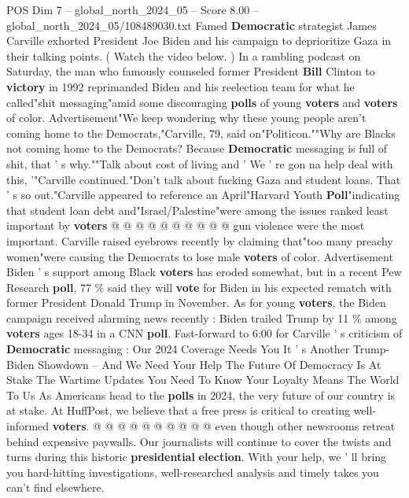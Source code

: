 \begin{textsample}{POS Dim 7 – global\_north\_2024\_05 – Score 8.00 – global\_north\_2024\_05/108489030.txt}  \label{ex:f7_pos_060}
Famed \textbf{Democratic} strategist James Carville exhorted President Joe Biden and his campaign to deprioritize Gaza in their talking points. ( Watch the video below. ) In a rambling podcast on Saturday, the man who famously counseled former President \textbf{Bill} Clinton to \textbf{victory} in 1992 reprimanded Biden and his reelection team for what he called"shit messaging"amid some discouraging \textbf{polls} of young \textbf{voters} and \textbf{voters} of color.
Advertisement"We keep wondering why these young people aren't coming home to the Democrats,"Carville, 79, said on"Politicon.""Why are Blacks not coming home to the Democrats?
Because \textbf{Democratic} messaging is full of shit, that ' s why.""Talk about cost of living and ' We ' re gon na help deal with this, '"Carville continued."Don't talk about fucking Gaza and student loans.
That ' s so out."Carville appeared to reference an April"Harvard Youth \textbf{Poll}"indicating that student loan debt and"Israel/Palestine"were among the issues ranked least important by \textbf{voters} @ @ @ @ @ @ @ @ @ @ gun violence were the most important.
Carville raised eyebrows recently by claiming that"too many preachy women"were causing the Democrats to lose male \textbf{voters} of color.
Advertisement Biden ' s support among Black \textbf{voters} has eroded somewhat, but in a recent Pew Research \textbf{poll}, 77 \% said they will \textbf{vote} for Biden in his expected rematch with former President Donald Trump in November.
As for young \textbf{voters}, the Biden campaign received alarming news recently : Biden trailed Trump by 11 \% among \textbf{voters} ages 18-34 in a CNN \textbf{poll}.
Fast-forward to 6:00 for Carville ' s criticism of \textbf{Democratic} messaging : Our 2024 Coverage Needs You It ' s Another Trump-Biden Showdown -- And We Need Your Help The Future Of Democracy Is At Stake The Wartime Updates You Need To Know Your Loyalty Means The World To Us As Americans head to the \textbf{polls} in 2024, the very future of our country is at stake.
At HuffPost, we believe that a free press is critical to creating well-informed \textbf{voters}. @ @ @ @ @ @ @ @ @ @ even though other newsrooms retreat behind expensive paywalls.
Our journalists will continue to cover the twists and turns during this historic \textbf{presidential} \textbf{election}.
With your help, we ' ll bring you hard-hitting investigations, well-researched analysis and timely takes you can't find elsewhere.

\end{textsample}
